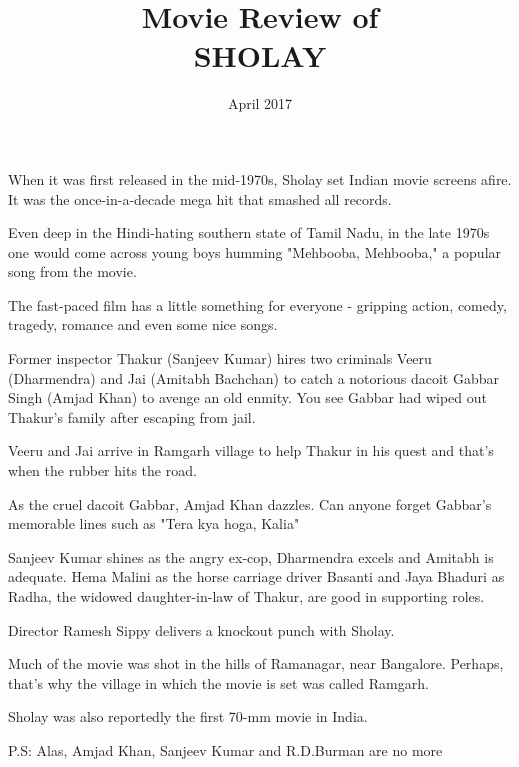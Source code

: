 \documentclass{article}
\title{Movie Review of\\\textsc{\LARGE{SHOLAY}}}
\date{April 2017}
\begin{document}
\maketitle

\section*{}

When it was first released in the mid-1970s, Sholay set Indian movie screens afire. It was the once-in-a-decade mega hit that smashed all records.

Even deep in the Hindi-hating southern state of Tamil Nadu, in the late 1970s one would come across young boys humming "Mehbooba, Mehbooba," a popular song from the movie.

The fast-paced film has a little something for everyone - gripping action, comedy, tragedy, romance and even some nice songs. 

Former inspector Thakur (Sanjeev Kumar) hires two criminals Veeru (Dharmendra) and Jai (Amitabh Bachchan) to catch a notorious dacoit Gabbar Singh (Amjad Khan) to avenge an old enmity. You see Gabbar had wiped out Thakur's family after escaping from jail.

Veeru and Jai arrive in Ramgarh village to help Thakur in his quest and that's when the rubber hits the road.

As the cruel dacoit Gabbar, Amjad Khan dazzles. Can anyone forget Gabbar's memorable lines such as "Tera kya hoga, Kalia"

Sanjeev Kumar shines as the angry ex-cop, Dharmendra excels and Amitabh is adequate. Hema Malini as the horse carriage driver Basanti and Jaya Bhaduri as Radha, the widowed daughter-in-law of Thakur, are good in supporting roles.

Director Ramesh Sippy delivers a knockout punch with Sholay.

Much of the movie was shot in the hills of Ramanagar, near Bangalore. Perhaps, that's why the village in which the movie is set was called Ramgarh.

Sholay was also reportedly the first 70-mm movie in India.

P.S: Alas, Amjad Khan, Sanjeev Kumar and R.D.Burman are no more
\end{document}
